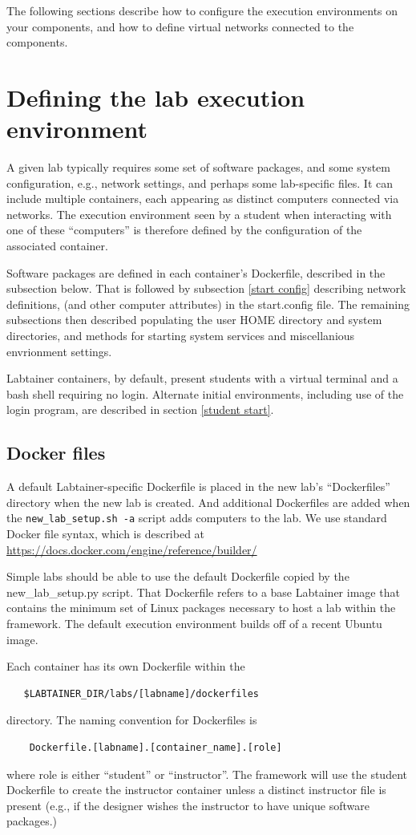\documentclass[12pt]{article}
\begin{document}
The following sections describe how to configure the execution environments on your components,
and how to define virtual networks connected to the components.

\section {Defining the lab execution environment}
\label{execution environment}
A given lab typically requires some set of software packages, and some
system configuration, e.g., network settings, and perhaps some lab-specific
files.  It can include multiple containers, each appearing as distinct
computers connected via networks.  The execution environment seen by a
student when interacting with one of these ``computers'' is therefore defined
by the configuration of the associated container. 

Software packages are defined in each container's Dockerfile, described in 
the subsection below. That is followed by subsection \ref{start config} describing network definitions,
(and other computer attributes) in the start.config file.  The remaining subsections then
described populating the user HOME directory and system directories, and methods for starting 
system services and miscellanious envrionment settings. 

Labtainer containers, by default, present students with a virtual terminal and a bash
shell requiring no login.  Alternate initial environments, including use of the login program, are
described in section \ref{student start}.

\subsection {Docker files}
A default Labtainer-specific Dockerfile is placed in the new lab's ``Dockerfiles'' 
directory when the new lab is created.  And additional Dockerfiles are added when the
{\tt new\_lab\_setup.sh -a} script adds computers to the lab. We use standard Docker file syntax, which is described at 
\url{https://docs.docker.com/engine/reference/builder/}

Simple labs should be able to use the default Dockerfile copied by the 
new\_lab\_setup.py script.  That Dockerfile refers to a base Labtainer
image that contains the minimum set of Linux packages necessary to 
host a lab within the framework.  The default
execution environment builds off of a recent Ubuntu image.

\noindent Each container has its own Dockerfile within the 
\begin{verbatim}
   $LABTAINER_DIR/labs/[labname]/dockerfiles
\end{verbatim}
\noindent directory.  The naming convention for Dockerfiles is
\begin{verbatim}
    Dockerfile.[labname].[container_name].[role]
\end{verbatim}
where role is either ``student'' or ``instructor''.  The framework will use the student Dockerfile to
create the instructor container unless a distinct instructor file is present (e.g., if the designer
wishes the instructor to have unique software packages.) 
\end{document}
